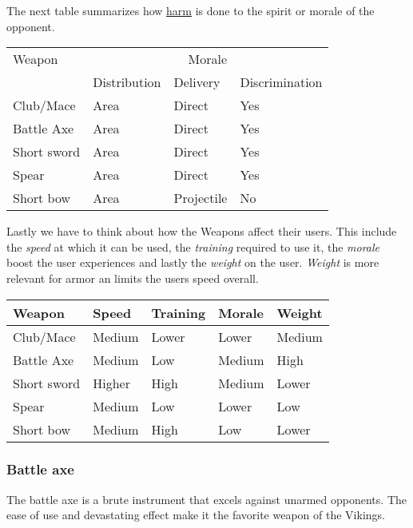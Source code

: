 The next table summarizes how \hyperref[ch:Conflict:Combat]{harm} is done to
the spirit or morale of the opponent.

\begin{longtable}{llll}
	\toprule
	Weapon
	 & \multicolumn{3}{c}{Morale}                               \\
	 & Distribution               & Delivery   & Discrimination \\
	\midrule
	Club/Mace
	 & Area                       & Direct     & Yes            \\
	Battle Axe
	 & Area                       & Direct     & Yes            \\
	Short sword
	 & Area                       & Direct     & Yes            \\
	Spear
	 & Area                       & Direct     & Yes            \\
	Short bow
	 & Area                       & Projectile & No             \\
	\bottomrule
\end{longtable}

Lastly we have to think about how the \glspl{Weapon} affect their users. This
include the \emph{speed} at which it can be used, the \emph{training} required
to use it, the \emph{morale} boost the user experiences and lastly the
\emph{weight} on the user. \emph{Weight} is more relevant for armor an limits
the users speed overall.

\begin{longtable}{lllll}
	\toprule
	Weapon
	 & Speed  & Training
	 & Morale & Weight   \\
	\midrule
	Club/Mace
	 & Medium & Lower
	 & Lower  & Medium   \\
	Battle Axe
	 & Medium & Low
	 & Medium & High     \\
	Short sword
	 & Higher & High
	 & Medium & Lower    \\
	Spear
	 & Medium & Low
	 & Lower  & Low      \\
	Short bow
	 & Medium & High
	 & Low    & Lower    \\
	\bottomrule
\end{longtable}

\subsubsection{Battle axe}\label{ch:Goods:Armory:Weapons:BattleAxe}

The battle axe is a brute instrument that excels against unarmed opponents. The
ease of use and devastating effect make it the favorite weapon of the
\gls{Vikings}.

